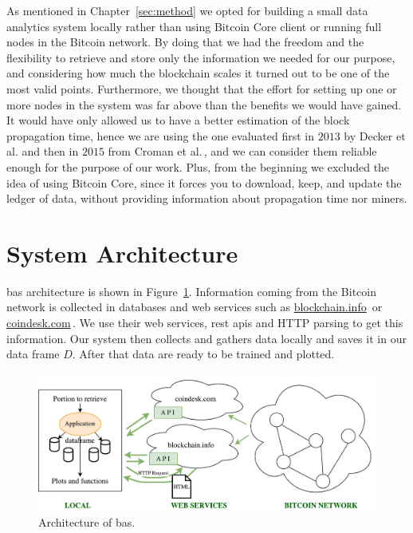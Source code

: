 \documentclass[USenglish]{uit-thesis}
\begin{document}
As mentioned in Chapter~\ref{sec:method} we opted for
building a small data analytics system locally rather than
using Bitcoin Core client or running full nodes
in the Bitcoin network. By doing that we had the
freedom and the flexibility to retrieve and store
only the information we needed for our purpose,
and considering how much the blockchain scales it
turned out to be one of the most valid points. Furthermore,
we thought that the effort for setting up one or more
nodes in the system was far above
than the benefits we would have gained. It would have
only allowed us to have a better estimation
of the block propagation time, hence
we are using the one evaluated first in $2013$ by
Decker et al. and then in $2015$
from Croman et al.\,\cite{Decker2013IPBN, croman2016}, and
we can consider them reliable enough for
the purpose of our work. Plus, from the
beginning we excluded the idea of using Bitcoin Core,
since it forces you to download, keep, and update
the ledger of data, without providing information
about propagation time nor miners.

\section{System Architecture}
\label{sec:implementation}
\gls{bas} architecture
is shown in Figure~\ref{fig:architecture}.
Information coming from the Bitcoin network
is collected in databases and web services such as
\url{blockchain.info}\,\cite{bitcoin_blockchain}
or \url{coindesk.com}\,\cite{coindesk}.
We use their web services, \gls{rest} \gls{api}s and
HTTP parsing to get this information.
Our system then
collects and gathers data locally and saves it
in our data frame $D$. After that data are
ready to be trained and plotted.
\begin{figure}[h]
	\centering
	\includegraphics[width=1\textwidth]{img/architecture}
	\caption{Architecture of \gls{bas}.}
	\label{fig:architecture}
\end{figure}
\end{document}
